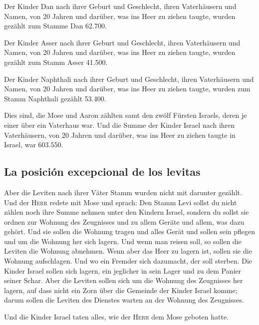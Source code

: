 Der Kinder Dan nach ihrer Geburt und Geschlecht, ihren
Vaterhäusern und Namen, von 20 Jahren und darüber, was ins Heer zu
ziehen taugte,  wurden gezählt zum Stamme Dan 62.700.

 Der Kinder Asser nach ihrer Geburt und Geschlecht, ihren
Vaterhäusern und Namen, von 20 Jahren und darüber, was ins Heer zu
ziehen taugte,  wurden gezählt zum Stamm Asser 41.500.

 Der Kinder Naphthali nach ihrer Geburt und Geschlecht,
ihren Vaterhäusern und Namen, von 20 Jahren und darüber, was ins Heer zu
ziehen taugte,  wurden zum Stamm Naphthali gezählt
53.400.

 Dies sind, die Mose und Aaron zählten samt den zwölf
Fürsten Israels, deren je einer über ein Vaterhaus war. 
Und die Summe der Kinder Israel nach ihren Vaterhäusern, von 20 Jahren
und darüber, was ins Heer zu ziehen taugte in Israel, 
war 603.550.

\hypertarget{la-posiciuxf3n-excepcional-de-los-levitas}{%
\subsection{La posición excepcional de los
levitas}\label{la-posiciuxf3n-excepcional-de-los-levitas}}

 Aber die Leviten nach ihrer Väter Stamm wurden nicht mit
darunter gezählt.  Und der \textsc{Herr} redete mit Mose
und sprach:  Den Stamm Levi sollst du nicht zählen noch
ihre Summe nehmen unter den Kindern Israel,  sondern du
sollst sie ordnen zur Wohnung des Zeugnisses und zu allem Geräte und
allem, was dazu gehört. Und sie sollen die Wohnung tragen und alles
Gerät und sollen sein pflegen und um die Wohnung her sich lagern.
 Und wenn man reisen soll, so sollen die Leviten die
Wohnung abnehmen. Wenn aber das Heer zu lagern ist, sollen sie die
Wohnung aufschlagen. Und wo ein Fremder sich dazumacht, der soll
sterben.  Die Kinder Israel sollen sich lagern, ein
jeglicher in sein Lager und zu dem Panier seiner Schar. 
Aber die Leviten sollen sich um die Wohnung des Zeugnisses her lagern,
auf dass nicht ein Zorn über die Gemeinde der Kinder Israel komme; darum
sollen die Leviten des Dienstes warten an der Wohnung des Zeugnisses.

 Und die Kinder Israel taten alles, wie der \textsc{Herr}
dem Mose geboten hatte.

